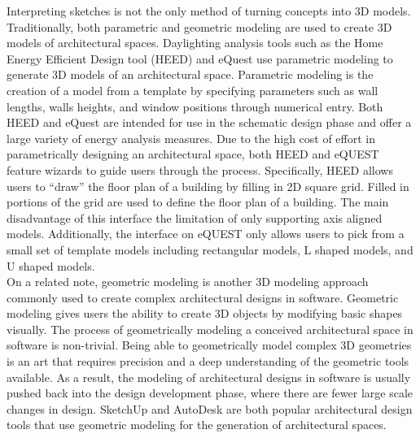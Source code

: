 	Interpreting sketches is not the only method of turning concepts into 3D models.
	Traditionally, both parametric and geometric modeling are used to create 3D models of architectural spaces.
	Daylighting analysis tools such as the Home Energy Efficient Design tool (HEED) and eQuest use parametric modeling to generate 3D models of an architectural space\cite{hirsch2010equest,milne2001drag}.
	Parametric modeling is the creation of a model from a template by specifying parameters such as wall lengths, walls heights, and window positions through numerical entry.
	Both HEED and eQuest are intended for use in the schematic design phase and offer a large variety of energy analysis measures.
	Due to the high cost of effort in parametrically designing an architectural space, both HEED and eQUEST feature wizards to guide users through the process. 
	Specifically, HEED allows users to ``draw'' the floor plan of a building by filling in 2D square grid. Filled in portions of the grid are used to define the floor plan of a building. The main disadvantage of this interface the limitation of only supporting axis aligned models. 
	Additionally, the interface on eQUEST only allows users to pick from a small set of template models including rectangular models, L shaped models, and U shaped models.\\

	On a related note, geometric modeling is another 3D modeling approach commonly used to create complex architectural designs in software.
	Geometric modeling gives users the ability to create 3D objects by modifying basic shapes visually.
	The process of geometrically modeling a conceived architectural space in software is non-trivial.
	Being able to geometrically model complex 3D geometries is an art that requires precision and a deep understanding of the geometric tools available.
	As a result, the modeling of architectural designs in software is usually pushed back into the design development phase, where there are fewer large scale changes in design\cite{Galasiu}.
	SketchUp and AutoDesk are both popular architectural design tools that use geometric modeling for the generation of architectural spaces. \\

